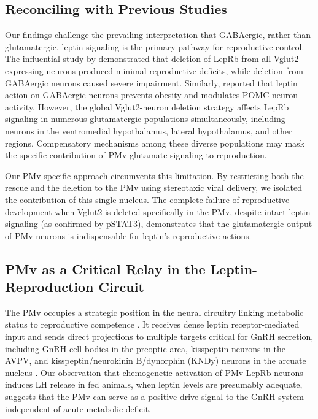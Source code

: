 \documentclass[12pt]{article}
\begin{document}
\subsection{Reconciling with Previous Studies}

Our findings challenge the prevailing interpretation that GABAergic, rather than glutamatergic, leptin signaling is the primary pathway for reproductive control. The influential study by \citet{zuure2013leptin} demonstrated that deletion of LepRb from all Vglut2-expressing neurons produced minimal reproductive deficits, while deletion from GABAergic neurons caused severe impairment. Similarly, \citet{vong2011leptin} reported that leptin action on GABAergic neurons prevents obesity and modulates POMC neuron activity. However, the global Vglut2-neuron deletion strategy affects LepRb signaling in numerous glutamatergic populations simultaneously, including neurons in the ventromedial hypothalamus, lateral hypothalamus, and other regions. Compensatory mechanisms among these diverse populations may mask the specific contribution of PMv glutamate signaling to reproduction.

Our PMv-specific approach circumvents this limitation. By restricting both the rescue and the deletion to the PMv using stereotaxic viral delivery, we isolated the contribution of this single nucleus. The complete failure of reproductive development when Vglut2 is deleted specifically in the PMv, despite intact leptin signaling (as confirmed by pSTAT3), demonstrates that the glutamatergic output of PMv neurons is indispensable for leptin's reproductive actions.

\subsection{PMv as a Critical Relay in the Leptin-Reproduction Circuit}

The PMv occupies a strategic position in the neural circuitry linking metabolic status to reproductive competence \citep{donato2011ventral, donato2013pmv}. It receives dense leptin receptor-mediated input and sends direct projections to multiple targets critical for GnRH secretion, including GnRH cell bodies in the preoptic area, kisspeptin neurons in the AVPV, and kisspeptin/neurokinin B/dynorphin (KNDy) neurons in the arcuate nucleus \citep{cravo2011characterization, padilla2017kisspeptin}. Our observation that chemogenetic activation of PMv LepRb neurons induces LH release in fed animals, when leptin levels are presumably adequate, suggests that the PMv can serve as a positive drive signal to the GnRH system independent of acute metabolic deficit.
\end{document}

